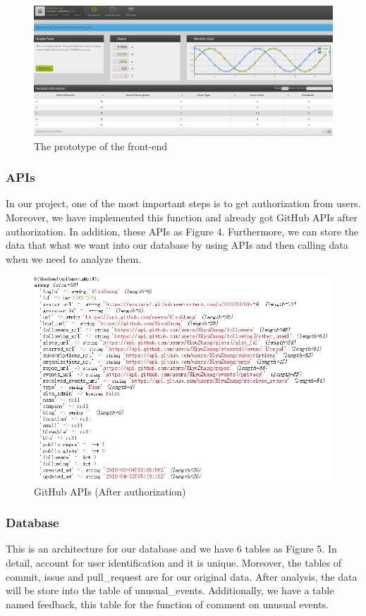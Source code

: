 \documentclass[conference]{IEEEtran}
\begin{document}
\begin{figure}[!ht]
\centering
\includegraphics[scale=0.2]{the_front-end_demo}
\caption{The prototype of the front-end}
\end{figure}

\subsubsection{APIs}
In our project, one of the most important steps is to get authorization from users. Moreover, we have implemented this function and already got GitHub APIs after authorization. In addition, these APIs as Figure 4. Furthermore, we can store the data that what we want into our database by using APIs and then calling data when we need to analyze them. 

\begin{figure}[!ht]
\centering
\includegraphics[scale=0.5]{APIs}
\caption{GitHub APIs (After authorization)}
\end{figure}

\subsubsection{Database}
This is an architecture for our database and we have 6 tables as Figure 5. In detail, account for user identification and it is unique. Moreover, the tables of commit, issue and pull\_request are for our original data. After analysis, the data will be store into the table of unusual\_events. Additionally, we have a table named feedback, this table for the function of comment on unusual events.
\end{document}
